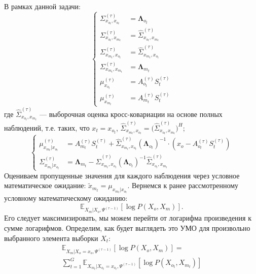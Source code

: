 \documentclass[11pt]{article}
\newcommand{\Expect}{\mathbb{E}}
\begin{document}
В рамках данной задачи:
\begin{equation}
\left\{ \begin{aligned} 
\Sigma_{x_{o_t},x_{o_t}}^{(\tau)} &= \mathbf{\Lambda}_{o_t} \\
\Sigma_{x_{o_t},x_{m_t}}^{(\tau)} &= \hat{\Sigma}_{x_{o_t},x_{m_t}}^{(\tau)} \\
\Sigma_{x_{m_t},x_{o_t}}^{(\tau)} &= \hat{\Sigma}_{x_{m_t},x_{o_t}}^{(\tau)} \\
\Sigma_{x_{m_t},x_{m_t}}^{(\tau)} &= \mathbf{\Lambda}_{m_t} \\
\mu_{x_{o_t}}^{(\tau)} &= A_{o_t}^{(\tau)}S_t^{(\tau)} \\
\mu_{x_{m_t}}^{(\tau)} &= A_{m_t}^{(\tau)}S_t^{(\tau)}
\end{aligned} \right.
\end{equation}
где $\hat{\Sigma}_{x_{o_t},x_{m_t}}^{(\tau)} $ --- выборочная оценка кросс-ковариации на основе полных наблюдений, т.е. таких, что $x_t = x_{o_t}$, $\hat{\Sigma}_{x_{m_t},x_{o_t}}^{(\tau)} = \Big(\hat{\Sigma}_{x_{o_t},x_{m_t}}^{(\tau)}\Big)^H$;
\begin{equation}
\left\{ \begin{aligned} 
\mu_{x_{m_t}|x_{o_t}}^{(\tau)} &= A_{m_t}^{(\tau)}S_t^{(\tau)} + \hat{\Sigma}_{x_{m_t},x_{o_t}}^{(\tau)}(\mathbf{\Lambda}_{o_t})^{-1}\cdot(x_o-A_{o_t}^{(\tau)}S_t^{(\tau)}) \\
\Sigma_{x_{m_t}|x_{o_t}}^{(\tau)} &= \mathbf{\Lambda}_{m_t}-\hat{\Sigma}_{x_{m_t},x_{o_t}}^{(\tau)}(\mathbf{\Lambda}_{o_t})^{-1}\hat{\Sigma}_{x_{o_t},x_{m_t}}^{(\tau)}
\end{aligned} \right.
\end{equation}
Оцениваем пропущенные значения для каждого наблюдения через условное математическое ожидание:
$\widetilde{x}_{m_t} = \mu_{x_{m_t}|x_{o_t}}$.
Вернемся к ранее рассмотренному условному математическому ожиданию:
\begin{equation*}
 \Expect_{X_m|X_o, \Psi^{(\tau-1)}}[\log P(X_o, X_m)].
\end{equation*}
Его следует максимизировать, мы можем перейти от логарифма произведения к сумме логарифмов. Определим, как будет выглядеть это УМО для произвольно выбранного элемента выборки $X_t$:
\begin{equation*}
\begin{gathered}
 \Expect_{X_m|X_o=x_o, \Psi^{(\tau-1)}}[\log P(X_o, X_m)] = \\
 \sum_{t=1}^G\Expect_{X_{m_t}|X_{o_t}=x_{o_t}, \Psi^{(\tau-1)}}[\log P(X_{o_t}, X_{m_t})]
\end{gathered}
\end{equation*}
\end{document}
